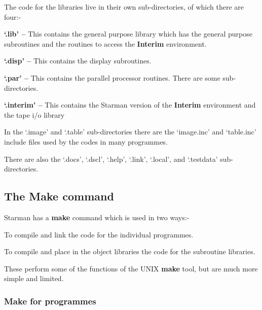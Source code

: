 The code for the libraries live in their own sub-directories, of which 
there are four:-

\begin{list}{{-}}{}
\item {\bf `.lib' -- } This contains the general purpose library which
has the general purpose subroutines and the routines to access the
{\bf Interim} environment.

\item {\bf `.disp' -- } This contains the display subroutines.

\item {\bf `.par' -- } This contains the parallel processor routines. There
                       are some sub-directories.

\item {\bf `.interim' -- } This contains the Starman version of the {\bf Interim} 
                           environment and the tape i/o library

\end{list}

In the `.image' and `.table' sub-directories there are the `image.inc' and
`table.inc' include files used by the codes in many programmes.

There are also the `.docs', `.dscl', `.help', `.link', `.local', and
`.testdata' sub-directories.

\subsection{The {\bf Make} command}

Starman has a {\bf make} command which is used in two ways:-

\begin{list}{{-}}{}
\item To compile and link the code for the individual programmes.
\item To compile and place in the object libraries the code for the
      subroutine libraries.
\end{list}

These perform some of the functions of the UNIX {\bf make} tool, but are
much more simple and limited.

\subsubsection{{\bf Make} for programmes}

\vspace*{3mm}

